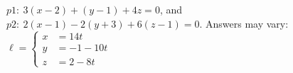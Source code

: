 {$p1:\ 3 (x - 2) + (y - 1) + 4 z=0$, and \\
$p2:\ 2 (x - 1) - 2 (y + 3) + 6 (z - 1)=0$.
}
{Answers may vary:\\
$\ell = \left\{\begin{aligned} x &= 14t\\
y &= -1-10t\\
z&= 2-8t\end{aligned} \right.$
}

